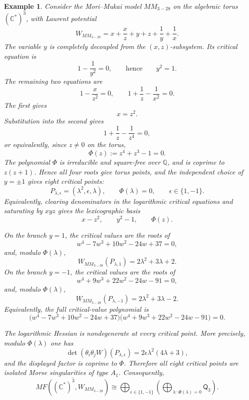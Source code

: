\documentclass[11pt]{amsart}
\newtheorem{example}{Example}[section]
\newcommand{\MorseCat}[1]{\mathsf{Q}_{#1}}
\begin{document}
\begin{example}
Consider the Mori--Mukai model $MM_{3-28}$ on the algebraic torus
$(\mathbb{C}^*)^3$, with Laurent potential
\[
W_{MM_{3-28}}=x+\frac{x}{z}+y+z+\frac{1}{y}+\frac{1}{x}.
\]
The variable $y$ is completely decoupled from the $(x,z)$-subsystem. Its
critical equation is
\[
1-\frac{1}{y^2}=0,
\qquad\text{hence}\qquad
y^2=1.
\]
The remaining two equations are
\[
1-\frac{x}{z^2}=0,
\qquad
1+\frac{1}{z}-\frac{1}{x^2}=0.
\]
The first gives
\[
x=z^2.
\]
Substitution into the second gives
\[
1+\frac{1}{z}-\frac{1}{z^4}=0,
\]
or equivalently, since $z\neq 0$ on the torus,
\[
\Phi(z):=z^4+z^3-1=0.
\]
The polynomial $\Phi$ is irreducible and square-free over $\mathbb{Q}$, and is
coprime to $z(z+1)$. Hence all four roots give torus points, and the independent
choice of $y=\pm1$ gives eight critical points:
\[
P_{\lambda,\epsilon}=\left(\lambda^2,\epsilon,\lambda\right),
\qquad
\Phi(\lambda)=0,
\qquad
\epsilon\in\{1,-1\}.
\]
Equivalently, clearing denominators in the logarithmic critical equations and
saturating by $xyz$ gives the lexicographic basis
\[
x-z^2,
\qquad
y^2-1,
\qquad
\Phi(z).
\]

On the branch $y=1$, the critical values are the roots of
\[
w^4-7w^3+10w^2-24w+37=0,
\]
and, modulo $\Phi(\lambda)$,
\[
W_{MM_{3-28}}(P_{\lambda,1})=2\lambda^2+3\lambda+2.
\]
On the branch $y=-1$, the critical values are the roots of
\[
w^4+9w^3+22w^2-24w-91=0,
\]
and, modulo $\Phi(\lambda)$,
\[
W_{MM_{3-28}}(P_{\lambda,-1})=2\lambda^2+3\lambda-2.
\]
Equivalently, the full critical-value polynomial is
\[
\bigl(w^4-7w^3+10w^2-24w+37\bigr)
\bigl(w^4+9w^3+22w^2-24w-91\bigr)=0.
\]

The logarithmic Hessian is nondegenerate at every critical point. More
precisely, modulo $\Phi(\lambda)$ one has
\[
\det(\theta_i\theta_jW)(P_{\lambda,\epsilon})
=2\epsilon\lambda^2(4\lambda+3),
\]
and the displayed factor is coprime to $\Phi$. Therefore all eight critical
points are isolated Morse singularities of type $A_1$. Consequently,
\[
\overline{MF((\mathbb{C}^*)^3,W_{MM_{3-28}})}
\cong \bigoplus_{\epsilon\in\{1,-1\}} \left(\bigoplus_{\lambda:\,\Phi(\lambda)=0}\MorseCat{3}\right).
\]
\end{example}
\end{document}
